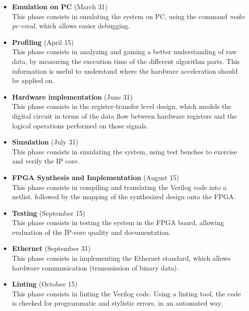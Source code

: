 \begin{itemize}
\item \textbf{Emulation on PC} (March 31)\\
This phase consists in emulating the system on PC, using the command \textit{make pc-emul}, which allows easier debugging.

\item \textbf{Profiling} (April 15)\\
This phase consists in analyzing and gaining a better understanding of raw data, by measuring the execution time of the different algorithm parts. This information is useful to understand where the hardware acceleration should be applied on.

\item \textbf{Hardware implementation} (June 31)\\
This phase consists in the register-transfer level design, which models the digital circuit in terms of the data flow between hardware registers and the logical operations performed on those signals.

\item \textbf{Simulation} (July 31)\\
This phase consists in simulating the system, using test benches to exercise and verify the IP core.

\item \textbf{FPGA Synthesis and Implementation} (August 15)\\
This phase consists in compiling and translating the Verilog code into a netlist, followed by the mapping of the synthesized design onto the FPGA.

\item \textbf{Testing} (September 15)\\
This phase consists in testing the system in the FPGA board, allowing evaluation of the IP-core quality and documentation.

\item \textbf{Ethernet} (September 31)\\
This phase consists in implementing the Ethernet standard, which allows hardware communication (transmission of binary data).

\item \textbf{Linting} (October 15)\\
This phase consists in linting the Verilog code. Using a linting tool, the code is checked for programmatic and stylistic errors, in an automated way.

\end{itemize}



